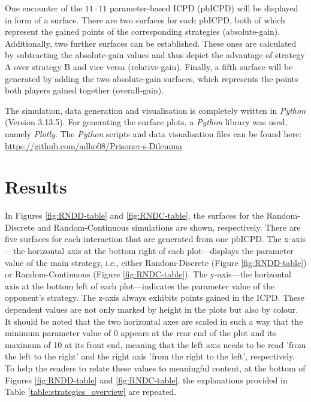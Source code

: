 \documentclass[11pt]{article}
\begin{document}
One encounter of the $11 \cdot 11$ parameter-based ICPD (pbICPD) will be displayed in form of a surface.
There are two surfaces for each pbICPD, both of which represent the gained points of the corresponding strategies (absolute-gain).
Additionally, two further surfaces can be established.
These ones are calculated by subtracting the absolute-gain values and thus depict the advantage of strategy A over strategy B and vice versa (relative-gain).
Finally, a fifth surface will be generated by adding the two absolute-gain surfaces, which represents the points both players gained together (overall-gain).

The simulation, data generation and visualisation is completely written in \textit{Python} (Version 3.13.5).
For generating the surface plots, a \textit{Python} library was used, namely \textit{Plotly}.
The \textit{Python} scripts and data visualisation files can be found here: \url{https://github.com/adho08/Prisoner-s-Dilemma}


\section{Results} \label{sec:results}

In Figures \ref{fig:RNDD-table} and \ref{fig:RNDC-table}, the surfaces for the Random-Discrete and Random-Continuous simulations are shown, respectively. 
There are five surfaces for each interaction that are generated from one pbICPD. 
The x-axis---the horizontal axis at the bottom right of each plot---displays the parameter value of the main strategy, i.e., either Random-Discrete (Figure \ref{fig:RNDD-table}) or Random-Continuous (Figure \ref{fig:RNDC-table}). 
The y-axis---the horizontal axis at the bottom left of each plot---indicates the parameter value of the opponent’s strategy. 
The z-axis always exhibits points gained in the ICPD.
These dependent values are not only marked by height in the plots but also by colour. 
It should be noted that the two horizontal axes are scaled in such a way that the minimum parameter value of 0 appears at the rear end of the plot and its maximum of 10 at its front end, meaning that the left axis needs to be read 'from the left to the right' and the right axis 'from the right to the left', respectively. 
To help the readers to relate these values to meaningful content, at the bottom of Figures \ref{fig:RNDD-table} and \ref{fig:RNDC-table}, the explanations provided in Table \ref{table:strategies_overview} are repeated.
\end{document}
